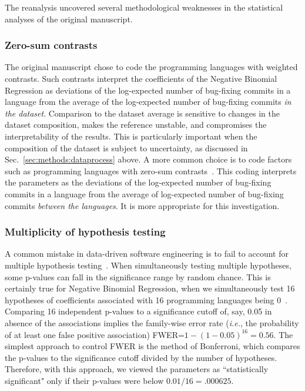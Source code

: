 \documentclass[acmsmall]{acmart}
\newcommand{\ie}{\emph{i.e.}\xspace}
\begin{document}
The reanalysis uncovered several methodological weaknesses in the
statistical analyses of the original manuscript.

\subsubsection{Zero-sum contrasts}\label{sec:zerosum}
The original manuscript chose to code the programming languages with
weighted contrasts.  Such contrasts interpret the coefficients of the
Negative Binomial Regression as deviations of the log-expected number of
bug-fixing commits in a language from the average of the log-expected number
of bug-fixing commits {\it in the dataset}. Comparison to the dataset
average is sensitive to changes in the dataset composition, makes the
reference unstable, and compromises the interpretability of the
results. This is particularly important when the composition of the dataset
is subject to uncertainty, as discussed in
Sec.~\ref{sec:methods:dataprocess} above.  A more common choice is to code
factors such as programming languages with zero-sum
contrasts~\cite{knnl}. This coding interprets the parameters as the
deviations of the log-expected number of bug-fixing commits in a language
from the average of log-expected number of bug-fixing commits {\it between
  the languages}. It is more appropriate for this investigation.

\subsubsection{Multiplicity of hypothesis testing}\label{sec:bonferroni}

A common mistake in data-driven software engineering is to fail to account
for multiple hypothesis testing~\cite{se-errors}. When simultaneously
testing multiple hypotheses, some p-values can fall in the significance
range by random chance. This is certainly true for Negative Binomial
Regression, when we simultaneously test 16 hypotheses of coefficients
associated with 16 programming languages being 0~\cite{knnl}. Comparing 16
independent p-values to a significance cutoff of, say, 0.05 in absence of
the associations implies the family-wise error rate (\ie, the probability
of at least one false positive association) FWER=$1-(1-0.05)^{16}=0.56$. The
simplest approach to control FWER is the method of Bonferroni, which
compares the p-values to the significance cutoff divided by the number of
hypotheses. Therefore, with this approach, we viewed the parameters as
``statistically significant" only if their p-values were below
$0.01/16=.000625$.
\end{document}
